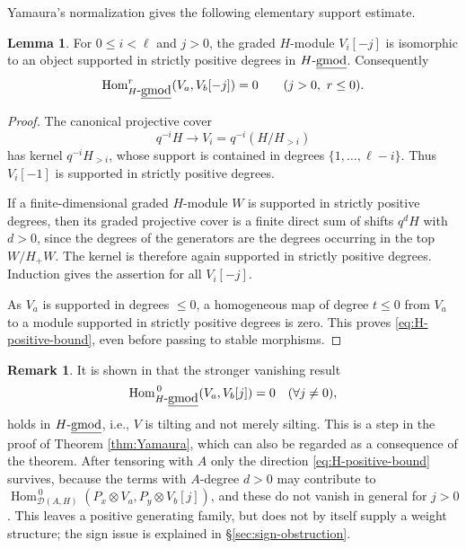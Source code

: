 \documentclass[11pt]{article}
\theoremstyle{definition}
\newtheorem{lem}[thm]{Lemma}
\newtheorem{rem}[thm]{Remark}
\numberwithin{equation}{section}
\def\udgmod{\mbox{-\underline{gmod}}}
\newcommand{\Hom}{\operatorname{Hom}}
\newcommand{\Der}{\mathcal{D}}
\begin{document}
Yamaura's normalization gives the following elementary support estimate.

\begin{lem}\label{lem:positive-syzygies}
For $0\le i<\ell$ and $j>0$, the graded $H$-module $V_i[-j]$ is isomorphic to an object supported in strictly positive degrees in $H\udgmod$.  Consequently
\begin{equation}\label{eq:H-positive-bound}
\Hom_{H\udgmod}^{r}(V_a,V_b[-j])=0
\qquad(j>0,\ r\le0).
\end{equation}
\end{lem}

\begin{proof}
The canonical projective cover
\[
q^{-i}H \to V_i=q^{-i}(H/H_{>i})
\]
has kernel $q^{-i}H_{>i}$, whose support is contained in degrees $\{1,\dots,\ell-i\}$.  Thus $ V_i[-1]$ is supported in strictly positive degrees.

If a finite-dimensional graded $H$-module $W$ is supported in strictly positive degrees, then its graded projective cover is a finite direct sum of shifts $q^dH$ with $d>0$, since the degrees of the generators are the degrees occurring in the top $W/H_+W$.  The kernel is therefore again supported in strictly positive degrees.  Induction gives the assertion for all $V_i[-j]$.

As $V_a$ is supported in degrees $\le0$, a homogeneous map of degree $t\le0$ from $V_a$ to a module supported in strictly positive degrees is zero.  This proves \eqref{eq:H-positive-bound}, even before passing to stable morphisms.
\end{proof}

\begin{rem}\label{rem:one-direction}
It is shown in \cite[Lemma 3.4]{Yamaura} that the stronger vanishing result 
\[
\Hom_{H\udgmod}^{\,0}(V_a,V_b[j])=0 \quad (\forall j\ne 0),
\]
holds in $H\udgmod$, i.e., $V$ is tilting and not merely silting. This is a step in the proof of Theorem \ref{thm:Yamaura}, which can also be regarded as a consequence of the theorem.  After tensoring with $A$ only the direction \eqref{eq:H-positive-bound} survives, because the terms with $A$-degree $d>0$ may contribute to $\Hom_{\Der(A,H)}^{\,0}(P_x\otimes V_a, P_y\otimes V_b[j])$, and these do not vanish in general for $j>0$.  This leaves a positive generating family, but does not by itself
supply a weight structure; the sign issue is explained in
\S\ref{sec:sign-obstruction}.
\end{rem}
\end{document}
